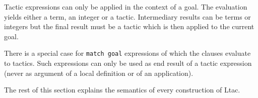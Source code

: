 Tactic expressions can only be applied in the context of a goal.  The
evaluation yields either a term, an integer or a tactic. Intermediary
results can be terms or integers but the final result must be a tactic
which is then applied to the current goal.

There is a special case for {\tt match goal} expressions of which
the clauses evaluate to tactics. Such expressions can only be used as
end result of a tactic expression (never as argument of a local
definition or of an application).

The rest of this section explains the semantics of every construction
of Ltac.





